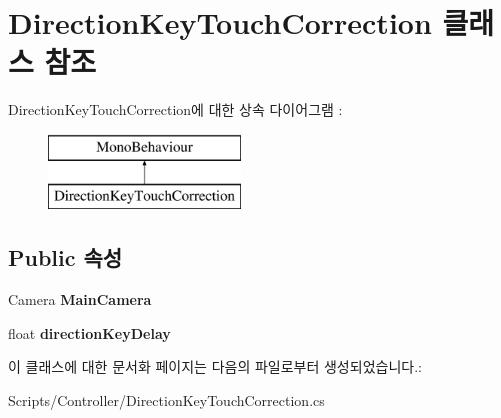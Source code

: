 \hypertarget{class_direction_key_touch_correction}{}\section{Direction\+Key\+Touch\+Correction 클래스 참조}
\label{class_direction_key_touch_correction}
Direction\+Key\+Touch\+Correction에 대한 상속 다이어그램 \+: \begin{figure}[H]
\begin{center}
\leavevmode
\includegraphics[height=2.000000cm]{class_direction_key_touch_correction}
\end{center}
\end{figure}
\subsection*{Public 속성}
\begin{DoxyCompactItemize}
\item 
\hypertarget{class_direction_key_touch_correction_a57ce7b918ca76cb3d2f829fe9561118a}{}Camera {\bfseries Main\+Camera}\label{class_direction_key_touch_correction_a57ce7b918ca76cb3d2f829fe9561118a}

\item 
\hypertarget{class_direction_key_touch_correction_aeb974449543426f940170e07d6adc8aa}{}float {\bfseries direction\+Key\+Delay}\label{class_direction_key_touch_correction_aeb974449543426f940170e07d6adc8aa}

\end{DoxyCompactItemize}


이 클래스에 대한 문서화 페이지는 다음의 파일로부터 생성되었습니다.\+:\begin{DoxyCompactItemize}
\item 
Scripts/\+Controller/Direction\+Key\+Touch\+Correction.\+cs\end{DoxyCompactItemize}
